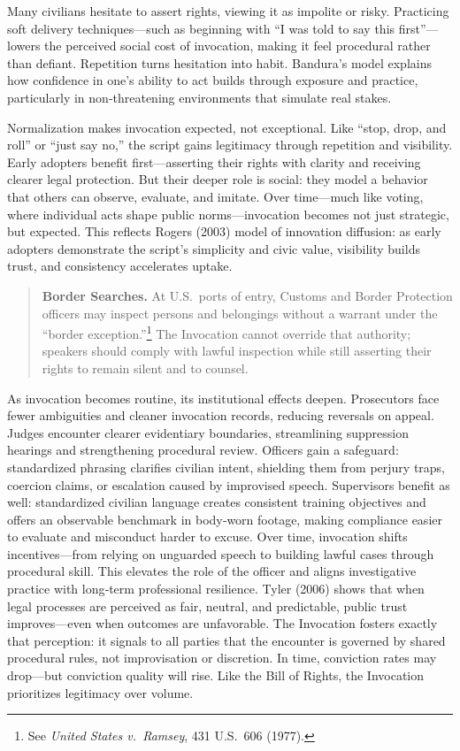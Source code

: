 Many civilians hesitate to assert rights, viewing it as impolite or risky. Practicing soft delivery techniques—such as beginning with ``I was told to say this first''—lowers the perceived social cost of invocation, making it feel procedural rather than defiant. Repetition turns hesitation into habit. Bandura’s model explains how confidence in one’s ability to act builds through exposure and practice, particularly in non‑threatening environments that simulate real stakes.

Normalization makes invocation expected, not exceptional. Like ``stop, drop, and roll'' or ``just say no,'' the script gains legitimacy through repetition and visibility. Early adopters benefit first—asserting their rights with clarity and receiving clearer legal protection. But their deeper role is social: they model a behavior that others can observe, evaluate, and imitate. Over time—much like voting, where individual acts shape public norms—invocation becomes not just strategic, but expected. This reflects Rogers (2003) model of innovation diffusion: as early adopters demonstrate the script’s simplicity and civic value, visibility builds trust, and consistency accelerates uptake.

\begin{quote}\small
\textbf{Border Searches.} At U.S.\ ports of entry, Customs and Border Protection officers may inspect persons and belongings without a warrant under the ``border exception.''\footnote{See \textit{United States v.\ Ramsey}, 431 U.S.\ 606 (1977).} The Invocation cannot override that authority; speakers should comply with lawful inspection while still asserting their rights to remain silent and to counsel.
\end{quote}

As invocation becomes routine, its institutional effects deepen. Prosecutors face fewer ambiguities and cleaner invocation records, reducing reversals on appeal. Judges encounter clearer evidentiary boundaries, streamlining suppression hearings and strengthening procedural review. Officers gain a safeguard: standardized phrasing clarifies civilian intent, shielding them from perjury traps, coercion claims, or escalation caused by improvised speech. Supervisors benefit as well: standardized civilian language creates consistent training objectives and offers an observable benchmark in body‑worn footage, making compliance easier to evaluate and misconduct harder to excuse. Over time, invocation shifts incentives—from relying on unguarded speech to building lawful cases through procedural skill. This elevates the role of the officer and aligns investigative practice with long‑term professional resilience. Tyler (2006) shows that when legal processes are perceived as fair, neutral, and predictable, public trust improves—even when outcomes are unfavorable. The Invocation fosters exactly that perception: it signals to all parties that the encounter is governed by shared procedural rules, not improvisation or discretion. In time, conviction rates may drop—but conviction quality will rise. Like the Bill of Rights, the Invocation prioritizes legitimacy over volume.

